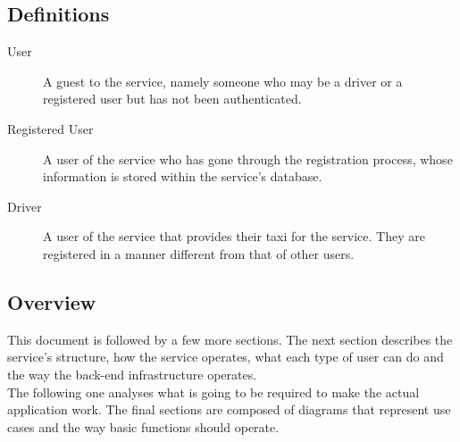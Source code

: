 \subsection{Definitions}
	\begin{description}
		\item[User]
			A guest to the service, namely someone who may be a driver or a registered user but has not been authenticated.
		\item[Registered User]
			A user of the service who has gone through the registration process, whose information is stored within the service's database.
		\item[Driver]
			A user of the service that provides their taxi for the service. They are registered in a manner different from that of other users.
	\end{description}
\subsection{Overview}
	This document is followed by a few more sections.
	The next section describes the service's structure, how the service operates, what each type of user can do and the way the
	back-end infrastructure operates. \\
	The following one analyses what is going to be required to make the actual application work.
	The final sections are composed of diagrams that represent use cases and the way basic functions should operate.

